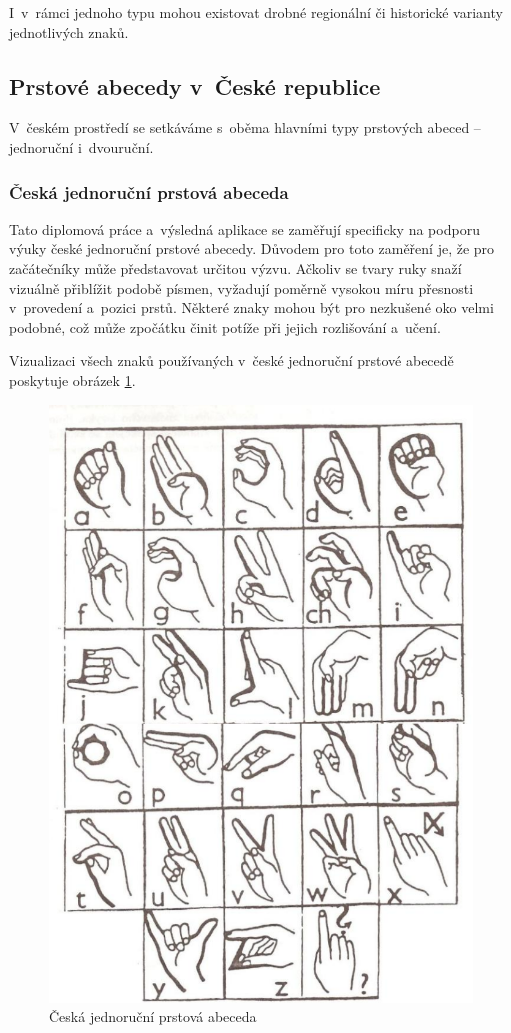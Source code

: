 \documentclass[
  master,
  program=ainfvs,
  biblatex,
  figures=true,
  tables=false,
  sourcecodes=true,
  glossaries,
  index
]{kidiplom}
\begin{document}
    I~v~rámci jednoho typu mohou existovat drobné regionální či historické varianty jednotlivých znaků.

    \subsection{Prstové abecedy v~České republice}
    
        V~českém prostředí se setkáváme s~oběma hlavními typy prstových abeced – jednoruční i~dvouruční.
    
        \subsubsection{Česká jednoruční prstová abeceda}
        
            Tato diplomová práce a~výsledná aplikace se zaměřují specificky na podporu výuky české jednoruční prstové abecedy. Důvodem pro toto zaměření je, že pro začátečníky může představovat určitou výzvu. Ačkoliv se tvary ruky snaží vizuálně přiblížit podobě písmen, vyžadují poměrně vysokou míru přesnosti v~provedení a~pozici prstů. Některé znaky mohou být pro nezkušené oko velmi podobné, což může zpočátku činit potíže při jejich rozlišování a~učení. 
        
        
            Vizualizaci všech znaků používaných v~české jednoruční prstové abecedě poskytuje obrázek \ref{prstova-abeceda}.
        
        \begin{figure}[htbp]
            \centering
            \includegraphics[width=0.5\columnwidth]{graphics/prstova-abeceda.png}
            \caption{Česká jednoruční prstová abeceda \cite{prstova-abeceda}}
            \label{prstova-abeceda}
        \end{figure}
        
\end{document}
